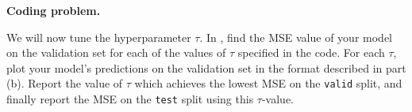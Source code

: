 \item {} \textbf{Coding problem.}

We will now tune the hyperparameter $\tau$.
In , find the MSE value of your model on the
validation set for each of the values of $\tau$ specified in the code. For each
$\tau$, plot your model's predictions on the validation set in the format
described in part (b). Report the value of $\tau$ which achieves the lowest MSE
on the \texttt{valid} split, and finally report the MSE on the \texttt{test}
split using this $\tau$-value.
